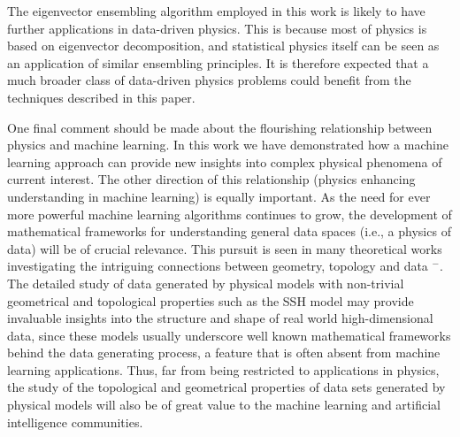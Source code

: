 \documentclass[10pt]{revtex4-1}
\begin{document}
The eigenvector ensembling algorithm employed in this work is likely to have further applications in data-driven physics. This is because most of physics is based on eigenvector decomposition, and statistical physics itself can be seen as an application of similar ensembling principles. It is therefore expected that a much broader class of data-driven physics problems could benefit from the techniques described in this paper.

One final comment should be made about the flourishing relationship between physics and machine learning. In this work we have demonstrated how a machine learning approach can provide new insights into complex physical phenomena of current interest. The other direction of this relationship (physics enhancing understanding in machine learning) is equally important. As the need for ever more powerful machine learning algorithms continues to grow, the development of mathematical frameworks for understanding general data spaces (i.e., a physics of data) will be of crucial relevance. This pursuit is seen in many theoretical works investigating the intriguing connections between geometry, topology and data \cite{carlsson2009topology}$^-$\cite{belkin2003problems}. The detailed study of data generated by physical models with non-trivial geometrical and topological properties such as the SSH model may provide invaluable insights into the structure and shape of real world high-dimensional data, since these models usually underscore well known mathematical frameworks behind the data generating process, a feature that is often absent from machine learning applications. Thus, far from being restricted to applications in physics, the study of the topological and geometrical properties of data sets generated by physical models will also be of great value to the machine learning and artificial intelligence communities.  
\end{document}
